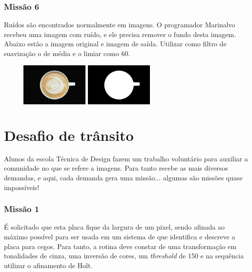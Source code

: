 \documentclass[
	12pt,				%
	oneside,			%
	a4paper,			%
	english,			%
	french,				%
	spanish,			%
	brazil,				%
	]{abntex2}
\begin{document}
\begin{apendicesenv}
\subsection{Missão 6}

Ruídos são encontrados normalmente em imagens. O programador Marinalvo recebeu uma imagem com ruído, e ele precisa remover o fundo desta imagem. Abaixo estão a imagem original e imagem de saída. Utilizar como filtro de suavização o de média e o limiar como 60.

\begin{figure}[H]
\centering
\includegraphics[width=0.3\textwidth]{imagens/desafioestudio/mission6_input.jpg}
\includegraphics[width=0.3\textwidth]{imagens/desafioestudio/mission6_output.png}
\end{figure}


\chapter{Desafio de trânsito}
\label{apen:trasito}

Alunos da escola Técnica de Design fazem um trabalho voluntário para auxiliar a comunidade no que se refere a imagens. Para tanto recebe as mais diversos demandas, e aqui, cada demanda gera uma missão... algumas são missões quase impossíveis!

\subsection{Missão 1}

É solicitado que esta placa fique da largura de um pixel, sendo afinada ao máximo possível para ser usada em um sistema de que identifica e descreve a placa para cegos. Para tanto, a rotina deve constar de uma transformação em tonalidades de cinza, uma inversão de cores, um \textit{threshold} de 150 e na sequência utilizar o afinamento de Holt. 


\end{apendicesenv}
\end{document}
